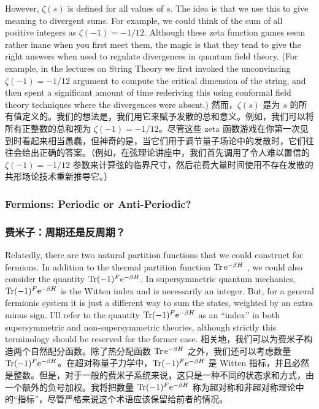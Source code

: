 \documentclass{article}
\newcommand{\rme}{\mathrm{e}}
\begin{document}
\begin{paracol}{2}
However, $\zeta(s)$ is deﬁned for all values of $s$. The idea is that we use this to give meaning to divergent sums. For example, we could think of the sum of all positive integers as $\zeta(- 1) = - 1 / 12$. Although these zeta function games seem rather inane when you ﬁrst meet them, the magic is that they tend to give the right answers when used to regulate divergences in quantum ﬁeld theory. (For example, in the lectures on String Theory we ﬁrst invoked the unconvincing $\zeta(- 1) = - 1 / 12$ argument to compute the critical dimension of the string, and then spent a signiﬁcant amount of time rederiving this using conformal ﬁeld theory techniques where the divergences were absent.)
\switchcolumn
然而，$\zeta(s)$ 是为 $s$ 的所有值定义的。我们的想法是，我们用它来赋予发散的总和意义。例如，我们可以将所有正整数的总和视为 $\zeta(- 1) = - 1 / 12$。尽管这些 zeta 函数游戏在你第一次见到时看起来相当愚蠢，但神奇的是，当它们用于调节量子场论中的发散时，它们往往会给出正确的答案。（例如，在弦理论讲座中，我们首先调用了令人难以置信的 $\zeta(- 1) = - 1 / 12$ 参数来计算弦的临界尺寸，然后花费大量时间使用不存在发散的共形场论技术重新推导它。）
\switchcolumn*

\subsubsection{Fermions: Periodic or Anti-Periodic?}
\switchcolumn
\subsubsection*{费米子：周期还是反周期？}
\switchcolumn*

Relatedly, there are two natural partition functions that we could construct for fermions. In addition to the thermal partition function $\Tr \rme^{- \beta H}$ , we could also consider the quantity $\Tr (-1)^F \rme^{- \beta H}$. In supersymmetric quantum mechanics, $\Tr (-1)^F \rme^{- \beta H}$ is the Witten index and is necessarily an integer. But, for a general fermionic system it is just a different way to sum the states, weighted by an extra minus sign. I’ll refer to the quantity $\Tr (-1)^F \rme^{- \beta H}$ as an “index” in both supersymmetric and non-supersymmetric theories, although strictly this terminology should be reserved for the former case.
\switchcolumn
相关地，我们可以为费米子构造两个自然配分函数。除了热分配函数 $\Tr \rme^{- \beta H}$ 之外，我们还可以考虑数量 $\Tr (-1)^F \rme^{- \beta H}$。在超对称量子力学中，$\Tr (-1)^F \rme^{- \beta H}$ 是 Witten 指标，并且必然是整数。但是，对于一般的费米子系统来说，这只是一种不同的状态求和方式，由一个额外的负号加权。我将把数量 $\Tr (-1)^F \rme^{- \beta H}$ 称为超对称和非超对称理论中的“指标”，尽管严格来说这个术语应该保留给前者的情况。
\switchcolumn*


\end{paracol}
\end{document}
